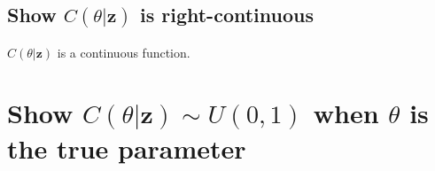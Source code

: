 \documentclass{article}
\begin{document}
\subsection{Show $C(\theta|\textbf{z})$ is right-continuous}
$C(\theta|\textbf{z})$ is a continuous function. 

\section{Show $C(\theta|\textbf{z}) \sim U(0, 1)$ when $\theta$ is the true parameter}
\end{document}
